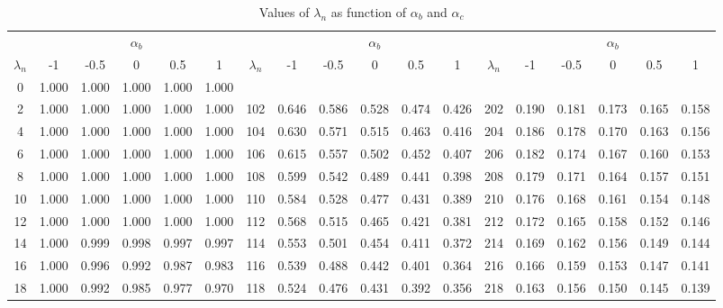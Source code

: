 \begin{table}[H]
\centering\scriptsize\setlength{\tabcolsep}{4pt}\renewcommand{\arraystretch}{1.03}
\caption{Values of $\lambda_n$ as function of $\alpha_b$ and $\alpha_c$}\label{tab:alpha_c}
\begin{tabular}{c|ccccc|c|ccccc|c|ccccc}
	\toprule
	            &    \multicolumn{5}{c|}{$\alpha_b$}    &             &    \multicolumn{5}{c|}{$\alpha_b$}    &             &    \multicolumn{5}{c}{$\alpha_b$}     \\
	$\lambda_n$ &  -1   & -0.5  &   0   &  0.5  &   1   & $\lambda_n$ &  -1   & -0.5  &   0   &  0.5  &   1   & $\lambda_n$ &  -1   & -0.5  &   0   &  0.5  &   1   \\ \midrule
	     0      & 1.000 & 1.000 & 1.000 & 1.000 & 1.000 &             &       &       &       &       &       &             &       &       &       &       &       \\
	     2      & 1.000 & 1.000 & 1.000 & 1.000 & 1.000 &     102     & 0.646 & 0.586 & 0.528 & 0.474 & 0.426 &     202     & 0.190 & 0.181 & 0.173 & 0.165 & 0.158 \\
	     4      & 1.000 & 1.000 & 1.000 & 1.000 & 1.000 &     104     & 0.630 & 0.571 & 0.515 & 0.463 & 0.416 &     204     & 0.186 & 0.178 & 0.170 & 0.163 & 0.156 \\
	     6      & 1.000 & 1.000 & 1.000 & 1.000 & 1.000 &     106     & 0.615 & 0.557 & 0.502 & 0.452 & 0.407 &     206     & 0.182 & 0.174 & 0.167 & 0.160 & 0.153 \\
	     8      & 1.000 & 1.000 & 1.000 & 1.000 & 1.000 &     108     & 0.599 & 0.542 & 0.489 & 0.441 & 0.398 &     208     & 0.179 & 0.171 & 0.164 & 0.157 & 0.151 \\
	    10      & 1.000 & 1.000 & 1.000 & 1.000 & 1.000 &     110     & 0.584 & 0.528 & 0.477 & 0.431 & 0.389 &     210     & 0.176 & 0.168 & 0.161 & 0.154 & 0.148 \\
	    12      & 1.000 & 1.000 & 1.000 & 1.000 & 1.000 &     112     & 0.568 & 0.515 & 0.465 & 0.421 & 0.381 &     212     & 0.172 & 0.165 & 0.158 & 0.152 & 0.146 \\
	    14      & 1.000 & 0.999 & 0.998 & 0.997 & 0.997 &     114     & 0.553 & 0.501 & 0.454 & 0.411 & 0.372 &     214     & 0.169 & 0.162 & 0.156 & 0.149 & 0.144 \\
	    16      & 1.000 & 0.996 & 0.992 & 0.987 & 0.983 &     116     & 0.539 & 0.488 & 0.442 & 0.401 & 0.364 &     216     & 0.166 & 0.159 & 0.153 & 0.147 & 0.141 \\
	    18      & 1.000 & 0.992 & 0.985 & 0.977 & 0.970 &     118     & 0.524 & 0.476 & 0.431 & 0.392 & 0.356 &     218     & 0.163 & 0.156 & 0.150 & 0.145 & 0.139 \\

\end{tabular}
\end{table}
